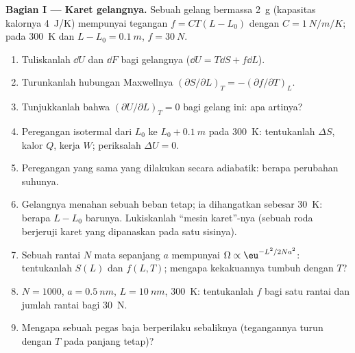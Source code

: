\begin{problem}\label{pb:b2:thermodynamic-potentials:1}
\textbf{Bagian I --- Karet gelangnya.}
Sebuah gelang bermassa \qty{2}{g} (kapasitas kalornya \qty{4}{J/K}) mempunyai tegangan
$f = CT(L - L_0)$ dengan $C = \qty{1}{N/m/K}$; pada \qty{300}{K} dan $L - L_0 =
\qty{0.1}{m}$, $f = \qty{30}{N}$.
\begin{enumerate}
  \item Tuliskanlah $\dd U$ dan $\dd F$ bagi gelangnya ($\dd U = T\dd S + f\dd L$).
  \item Turunkanlah hubungan Maxwellnya $(\partial S/\partial L)_T = -(\partial
        f/\partial T)_L$.
  \item Tunjukkanlah bahwa $(\partial U/\partial L)_T = 0$ bagi gelang ini: apa
        artinya?
  \item Peregangan isotermal dari $L_0$ ke $L_0 + \qty{0.1}{m}$ pada
        \qty{300}{K}: tentukanlah $\Delta S$, kalor $Q$, kerja $W$; periksalah $\Delta U = 0$.
  \item Peregangan yang sama yang dilakukan secara adiabatik: berapa perubahan suhunya.
  \item Gelangnya menahan sebuah beban tetap; ia dihangatkan sebesar \qty{30}{K}: berapa
        $L - L_0$ barunya. Lukiskanlah ``mesin karet''-nya (sebuah roda berjeruji
        karet yang dipanaskan pada satu sisinya).
  \item Sebuah rantai $N$ mata sepanjang $a$ mempunyai $\Omega \propto \eu^{-L^2/2Na^2}$:
        tentukanlah $S(L)$ dan $f(L,T)$; mengapa kekakuannya tumbuh dengan $T$?
  \item $N = 1000$, $a = \qty{0.5}{nm}$, $L = \qty{10}{nm}$, \qty{300}{K}: tentukanlah $f$
        bagi satu rantai dan jumlah rantai bagi \qty{30}{N}.
  \item Mengapa sebuah pegas baja berperilaku sebaliknya (tegangannya turun
        dengan $T$ pada panjang tetap)?
\end{enumerate}


\end{problem}
